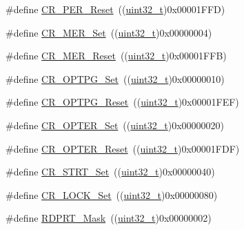 \begin{DoxyCompactItemize}
\#define \hyperlink{group___f_l_a_s_h___private___defines_gad564767c401a1a9c36b71342448fd256}{C\+R\+\_\+\+P\+E\+R\+\_\+\+Reset}~((\hyperlink{_p_e___types_8h_a33594304e786b158f3fb30289278f5af}{uint32\+\_\+t})0x00001\+F\+F\+D)
\item 
\#define \hyperlink{group___f_l_a_s_h___private___defines_ga7e5cf18b31b5ed960cd05a816cadf973}{C\+R\+\_\+\+M\+E\+R\+\_\+\+Set}~((\hyperlink{_p_e___types_8h_a33594304e786b158f3fb30289278f5af}{uint32\+\_\+t})0x00000004)
\item 
\#define \hyperlink{group___f_l_a_s_h___private___defines_gabed855f33ff965c530c2b09a49a987f5}{C\+R\+\_\+\+M\+E\+R\+\_\+\+Reset}~((\hyperlink{_p_e___types_8h_a33594304e786b158f3fb30289278f5af}{uint32\+\_\+t})0x00001\+F\+F\+B)
\item 
\#define \hyperlink{group___f_l_a_s_h___private___defines_ga84ec77ffaa2a83edeef385e3a36171f8}{C\+R\+\_\+\+O\+P\+T\+P\+G\+\_\+\+Set}~((\hyperlink{_p_e___types_8h_a33594304e786b158f3fb30289278f5af}{uint32\+\_\+t})0x00000010)
\item 
\#define \hyperlink{group___f_l_a_s_h___private___defines_ga9dd2ca46f4e8edfa098e1481699c08b7}{C\+R\+\_\+\+O\+P\+T\+P\+G\+\_\+\+Reset}~((\hyperlink{_p_e___types_8h_a33594304e786b158f3fb30289278f5af}{uint32\+\_\+t})0x00001\+F\+E\+F)
\item 
\#define \hyperlink{group___f_l_a_s_h___private___defines_gac5707368555a5b7400eea1e306b62b16}{C\+R\+\_\+\+O\+P\+T\+E\+R\+\_\+\+Set}~((\hyperlink{_p_e___types_8h_a33594304e786b158f3fb30289278f5af}{uint32\+\_\+t})0x00000020)
\item 
\#define \hyperlink{group___f_l_a_s_h___private___defines_ga0245cfe194895f1ad98ba66f8eda3e47}{C\+R\+\_\+\+O\+P\+T\+E\+R\+\_\+\+Reset}~((\hyperlink{_p_e___types_8h_a33594304e786b158f3fb30289278f5af}{uint32\+\_\+t})0x00001\+F\+D\+F)
\item 
\#define \hyperlink{group___f_l_a_s_h___private___defines_ga0e6349818d8602ffffc56e5e04d9ab13}{C\+R\+\_\+\+S\+T\+R\+T\+\_\+\+Set}~((\hyperlink{_p_e___types_8h_a33594304e786b158f3fb30289278f5af}{uint32\+\_\+t})0x00000040)
\item 
\#define \hyperlink{group___f_l_a_s_h___private___defines_gaee27a8100366266daa8d3a69c589e4b9}{C\+R\+\_\+\+L\+O\+C\+K\+\_\+\+Set}~((\hyperlink{_p_e___types_8h_a33594304e786b158f3fb30289278f5af}{uint32\+\_\+t})0x00000080)
\item 
\#define \hyperlink{group___f_l_a_s_h___private___defines_gaa624b669116384b971b838ae201cad9f}{R\+D\+P\+R\+T\+\_\+\+Mask}~((\hyperlink{_p_e___types_8h_a33594304e786b158f3fb30289278f5af}{uint32\+\_\+t})0x00000002)

\end{DoxyCompactItemize}
